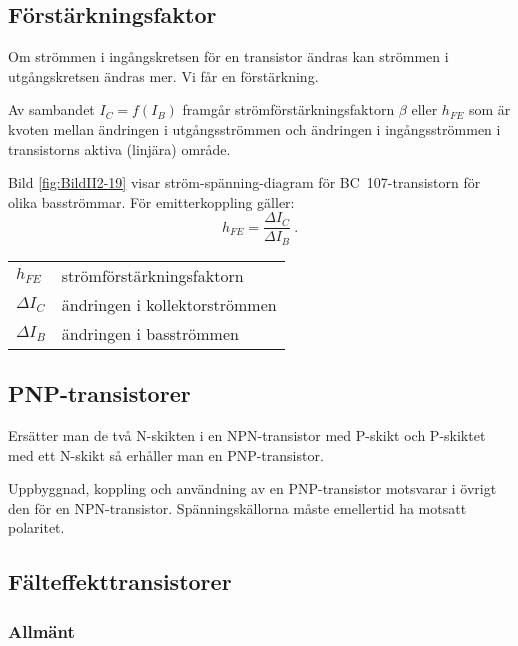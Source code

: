 \subsection{Förstärkningsfaktor}

Om strömmen i ingångskretsen för en transistor ändras kan strömmen i
utgångskretsen ändras mer.
Vi får en förstärkning.

Av sambandet \(I_C = f(I_B)\) framgår strömförstärkningsfaktorn \(\beta\) eller
\(h_{FE}\) som är kvoten mellan ändringen i utgångsströmmen och ändringen i ingångsströmmen i
transistorns aktiva (linjära) område.

Bild \ref{fig:BildII2-19} visar ström-spänning-diagram för BC~107-transistorn
för olika basströmmar.
För emitterkoppling gäller:
\[h_{FE} = \dfrac{\Delta I_C}{\Delta I_B}~.\]
\begin{tabular}{ll}
  \(h_{FE}\) & strömförstärkningsfaktorn \\
  \(\Delta I_C\)   & ändringen i kollektorströmmen \\
  \(\Delta I_B\)   & ändringen i basströmmen \\
\end{tabular}

\subsection{PNP-transistorer}

Ersätter man de två N-skikten i en NPN-transistor med P-skikt och P-skiktet med
ett N-skikt så erhåller man en PNP-transistor.

Uppbyggnad, koppling och användning av en PNP-transistor motsvarar i övrigt den
för en NPN-transistor. Spänningskällorna måste emellertid ha motsatt polaritet.

\subsection{Fälteffekttransistorer}

\subsubsection{Allmänt}

